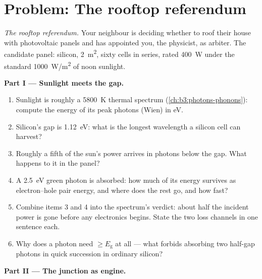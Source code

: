 \section{Problem: The rooftop referendum}

\begin{problem}\label{pb:b3:electrons-in-solids:1}
\emph{The rooftop referendum.} Your neighbour is deciding whether
to roof their house with photovoltaic panels and has appointed
you, the physicist, as arbiter. The candidate panel: silicon,
\qty{2}{m^2}, sixty cells in series, rated \qty{400}{W} under
the standard \qty{1000}{W/m^2} of noon sunlight.

\medskip\noindent\textbf{Part I --- Sunlight meets the gap.}

\begin{enumerate}
  \item Sunlight is roughly a \qty{5800}{K} thermal spectrum
        (\cref{ch:b3:photons-phonons}): compute the energy of its
        peak photons (Wien) in eV.
  \item Silicon's gap is \qty{1.12}{eV}: what is the longest
        wavelength a silicon cell can harvest?
  \item Roughly a fifth of the sun's power arrives in photons
        below the gap. What happens to it in the panel?
  \item A \qty{2.5}{eV} green photon is absorbed: how much of its
        energy survives as electron--hole pair energy, and where
        does the rest go, and how fast?
  \item Combine items 3 and 4 into the spectrum's verdict: about
        half the incident power is gone before any electronics
        begins. State the two loss channels in one sentence each.
  \item Why does a photon need $\ge E_{\text{g}}$ at all --- what
        forbids absorbing two half-gap photons in quick
        succession in ordinary silicon?
\end{enumerate}

\medskip\noindent\textbf{Part II --- The junction as engine.}


\end{problem}
